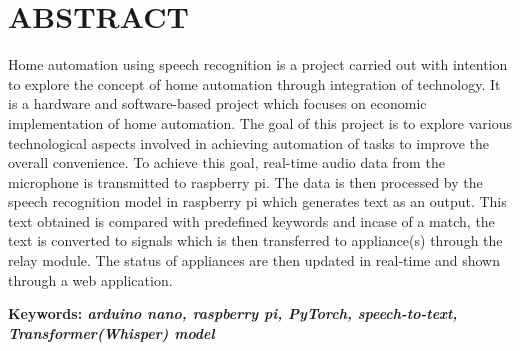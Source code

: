 \setcounter{page}{1}
\chapter*{ABSTRACT}


Home automation using speech recognition is a project carried out with intention to explore the concept of home automation through integration of technology. It is a hardware and software-based project which focuses on economic implementation of home automation. The goal of this project is to explore various technological aspects involved in  achieving automation of tasks to improve the overall convenience. To achieve this goal, real-time audio data from the microphone is transmitted to raspberry pi. The data is then processed by the speech recognition model in raspberry pi which generates text as an output. This text obtained is compared with predefined keywords and incase of a match, the text is converted to signals which is then transferred to appliance(s) through the relay module. The status of appliances are then updated in real-time and shown through a web application.

\par
\textbf{Keywords: \textit{arduino nano, raspberry pi, PyTorch, speech-to-text, Transformer(Whisper) model}}

